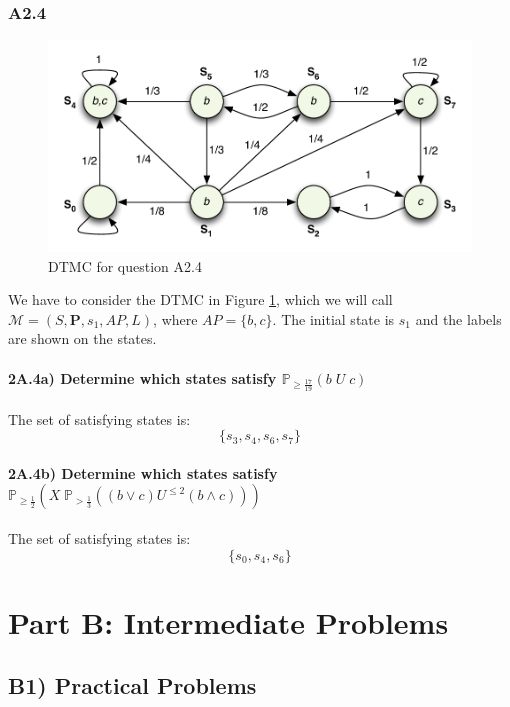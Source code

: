 \documentclass[12pt]{report}
\begin{document}
\subsection*{A2.4}
\begin{figure}[H]
	\begin{center}
		\includegraphics[scale=.85]{../GFX/ExerciseFigure3.pdf}
	\end{center}
	\caption{DTMC for question A2.4}
	\label{fig:2a4}
\end{figure}

We have to consider the DTMC in Figure \ref{fig:2a4}, which we will call $\mathcal{M} = \left(S, \mathbf{P}, s_1, AP, L\right)$, where $AP = \{b,c\}$. The initial state is $s_1$ and the labels are shown on the states.

\subsubsection*{2A.4a) Determine which states satisfy $\mathbb{P}_{\geq\frac{17}{19}}(b\;U\;c)$}
The set of satisfying states is:
$$\{s_3, s_4, s_6, s_7\}$$

\subsubsection*{2A.4b) Determine which states satisfy $\mathbb{P}_{\geq\frac{1}{2}}\left(X\;\mathbb{P}_{>\frac{1}{3}}\left( \left(b \vee c \right) U^{\leq 2} \left( b \wedge c \right) \right) \right)$}
The set of satisfying states is:
$$\{s_0, s_4, s_6\}$$

\chapter*{Part B: Intermediate Problems}
\section*{B1) Practical Problems}
\end{document}
